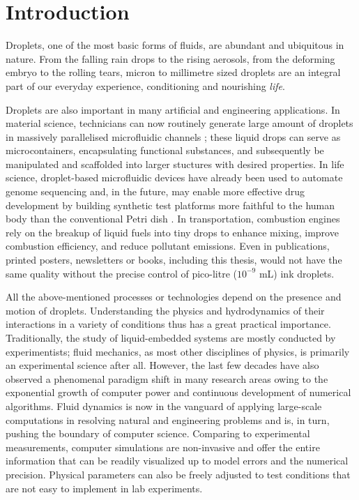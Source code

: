 \graphicspath{{imgs/}}

\chapter{Introduction}

Droplets, one of the most basic forms of fluids, are abundant and ubiquitous in nature.
From the falling rain drops to the rising aerosols, from the deforming embryo to the rolling tears, micron to millimetre sized droplets are an integral part of our everyday experience, conditioning and nourishing \emph{life}.

Droplets are also important in many artificial and engineering applications.
In material science, technicians can now routinely generate large amount of droplets in massively parallelised microfluidic channels \citep{microfluidics}; these liquid drops can serve as microcontainers, encapsulating functional substances, and subsequently be manipulated and scaffolded into larger stuctures with desired properties.
In life science, droplet-based microfluidic devices have already been used to automate genome sequencing and, in the future, may enable more effective drug development by building synthetic test platforms more faithful to the human body than the conventional Petri dish \citep{Squires_Quakes_2005, organs-on-chips}.
In transportation, combustion engines rely on the breakup of liquid fuels into tiny drops to enhance mixing, improve combustion efficiency, and reduce pollutant emissions.
Even in publications, printed posters, newsletters or books, including this thesis, would not have the same quality without the precise control of pico-litre ($10^{-9}$ mL) ink droplets.

All the above-mentioned processes or technologies depend on the presence and motion of droplets.
Understanding the physics and hydrodynamics of their interactions in a variety of conditions thus has a great practical importance.
Traditionally, the study of liquid-embedded systems are mostly conducted by experimentists; fluid mechanics, as most other disciplines of physics, is primarily an experimental science after all.
However, the last few decades have also observed a phenomenal paradigm shift in many research areas owing to the exponential growth of computer power and continuous development of numerical algorithms.
Fluid dynamics is now in the vanguard of applying large-scale computations in resolving natural and engineering problems and is, in turn, pushing the boundary of computer science.
Comparing to experimental measurements, computer simulations are non-invasive and offer the entire information that can be readily visualized up to model errors and the numerical precision.
Physical parameters can also be freely adjusted to test conditions that are not easy to implement in lab experiments.

